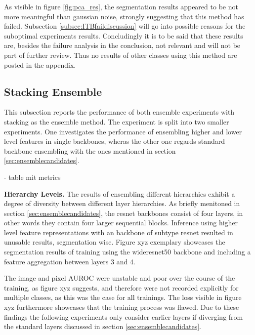 

As visible in figure \ref{fig:pca_res}, the segmentation results appeared to be not more meaningful than gaussian noise, strongly suggesting that this method has failed. Subsection 
\ref{subsec:ITBfaildiscussion} will go into possible reasons for the suboptimal experiments results. Concludingly it is to be said that these results are, besides the failure analysis 
in the conclusion, not relevant and will not be part of further review. Thus no results of other classes using this method are posted in the appendix.

\subsection{Stacking Ensemble}
\label{subsec:stacking}
This subsection reports the performance of both ensemble experiments with stacking as the ensemble method. 
The experiment is split into two smaller experiments. One investigates the performance of ensembling higher and lower level features in 
single backbones, wheras the other one regards standard backbone ensembling with the ones mentioned in section \ref{sec:ensemblecandidates}. 

- table mit metrics


\textbf{Hierarchy Levels.} The results of ensembling different hierarchies exhibit a degree of diversity between different layer hierarchies. As briefly menitoned in section \ref{sec:ensemblecandidates}, the resnet backbones consist of four 
layers, in other words they contain four larger sequential blocks. Inference using higher level feature representations with an backbone of subtype resnet resulted in unusable results, segmentation wise. 
Figure xyz exemplary showcases the segmentation results of training using the wideresnet50 backbone and including a feature aggregation between layers 3 and 4. 



The image and pixel AUROC were unstable and poor over the course of the training, 
as figure xyz suggests, and therefore were not recorded explicitly for multiple classes, as this was the case for all trainings. The loss visible in figure xyz furthermore 
showcases that the training process was flawed. Due to these findings the following experiments only consider earlier layers if diverging from the standard layers 
discussed in section \ref{sec:ensemblecandidates}.

